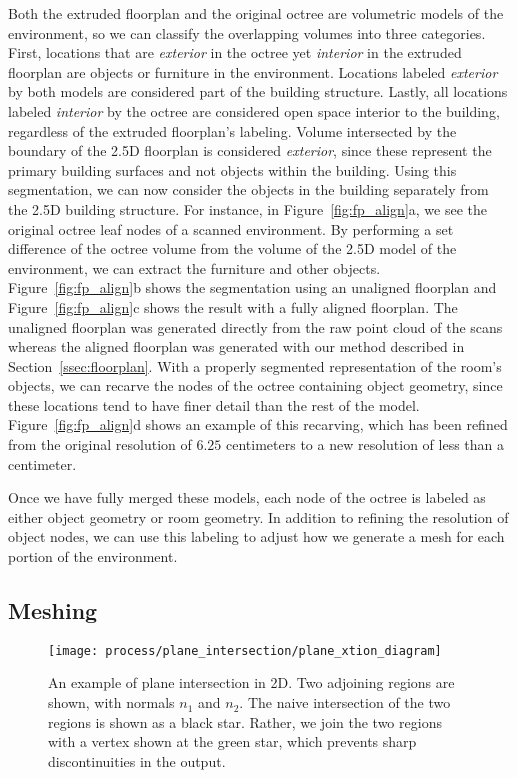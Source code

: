 \documentclass[review]{acmsiggraph}
\begin{document}
Both the extruded floorplan and the original octree are volumetric models of the environment, so we can classify the overlapping volumes into three categories.  First, locations that are {\it exterior} in the octree yet {\it interior} in the extruded floorplan are objects or furniture in the environment.  Locations labeled {\it exterior} by both models are considered part of the building structure.  Lastly, all locations labeled {\it interior} by the octree are considered open space interior to the building, regardless of the extruded floorplan's labeling.  Volume intersected by the boundary of the 2.5D floorplan is considered {\it exterior}, since these represent the primary building surfaces and not objects within the building.  Using this segmentation, we can now consider the objects in the building separately from the 2.5D building structure.  For instance, in Figure~\ref{fig:fp_align}a, we see the original octree leaf nodes of a scanned environment.  By performing a set difference of the octree volume from the volume of the 2.5D model of the environment, we can extract the furniture and other objects.  Figure~\ref{fig:fp_align}b shows the segmentation using an unaligned floorplan and Figure~\ref{fig:fp_align}c shows the result with a fully aligned floorplan.  The unaligned floorplan was generated directly from the raw point cloud of the scans whereas the aligned floorplan was generated with our method described in Section~\ref{ssec:floorplan}.  With a properly segmented representation of the room's objects, we can recarve the nodes of the octree containing object geometry, since these locations tend to have finer detail than the rest of the model.  Figure~\ref{fig:fp_align}d shows an example of this recarving, which has been refined from the original resolution of $6.25$ centimeters to a new resolution of less than a centimeter.

Once we have fully merged these models, each node of the octree is labeled as either object geometry or room geometry.  In addition to refining the resolution of object nodes, we can use this labeling to adjust how we generate a mesh for each portion of the environment.  

\subsection{Meshing}
\label{ssec:meshing}

\begin{figure}
	\centerline{\texttt{[image: process/plane\_intersection/plane\_xtion\_diagram]}}
	\caption{An example of plane intersection in 2D.  Two adjoining regions are shown, with normals $n_1$ and $n_2$.  The naive intersection of the two regions is shown as a black star.  Rather, we join the two regions with a vertex shown at the green star, which prevents sharp discontinuities in the output.}
	\label{fig:plane_xtion}
\end{figure}
\end{document}
